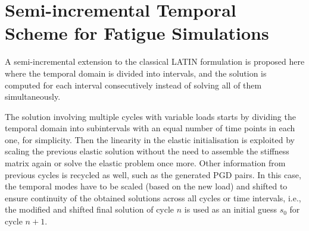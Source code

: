 \section{Semi-incremental Temporal Scheme for Fatigue Simulations}
\label{sec_temporalscheme}

A semi-incremental extension to the classical LATIN formulation is proposed here where the temporal domain is divided into intervals, and the solution is computed for each interval consecutively instead of solving all of them simultaneously.

The solution involving multiple cycles with variable loads starts by dividing the temporal domain into subintervals with an equal number of time points in each one, for simplicity. Then the linearity in the elastic initialisation is exploited by scaling the previous elastic solution without the need to assemble the stiffness matrix again or solve the elastic problem once more. Other information from previous cycles is recycled as well, such as the generated PGD pairs. In this case, the temporal modes have to be scaled (based on the new load) and shifted to ensure continuity of the obtained solutions across all cycles or time intervals, i.e., the modified and shifted final solution of cycle $n$ is used as an initial guess $s_0$ for cycle $n+1$.

